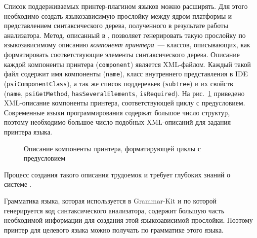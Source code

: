 Список поддерживаемых принтер-плагином языков можно расширять.
Для этого необходимо создать языкозависимую прослойку между ядром платформы и представлением синтаксического дерева, полученного в результате работы анализатора.
Метод, описанный в \cite{paper:while}, позволяет генерировать такую прослойку по языкозависимому описанию \emph{компонент принтера}~--- классов, описывающих, как форматировать соответствующие элементы синтаксического дерева.
Описание каждой компоненты принтера (\lstinline{component}) является XML-файлом. Каждый такой файл содержит имя компоненты (\lstinline{name}), класс внутреннего представления в IDE (\lstinline{psiComponentClass}), %
а так же список поддеревьев (\lstinline{subtree}) и их свойств (\lstinline{name}, \lstinline{psiGetMethod}, \lstinline{hasSeveralElements}, \lstinline{isRequired}).
На рис.~\ref{intro:whileComponent} приведено XML-описание компоненты принтера, соответствующей циклу с предусловием.
Современные языки программирования содержат большое число структур, поэтому необходимо большое число подобных XML-описаний для задания принтера языка.
\begin{figure}[t]
    
    \caption{Описание компоненты принтера, форматирующей циклы с предусловием}
    \label{intro:whileComponent}
\end{figure}
\noindent
Процесс создания такого описания трудоемок и требует глубоких знаний о системе \cite{paper:while}.

Грамматика языка, которая используется в Grammar-Kit и по которой генерируется код синтаксического анализатора, содержит большую часть необходимой информации для создания этой языкозависимой прослойки.
Поэтому принтер для целевого языка можно получать по грамматике этого языка.
